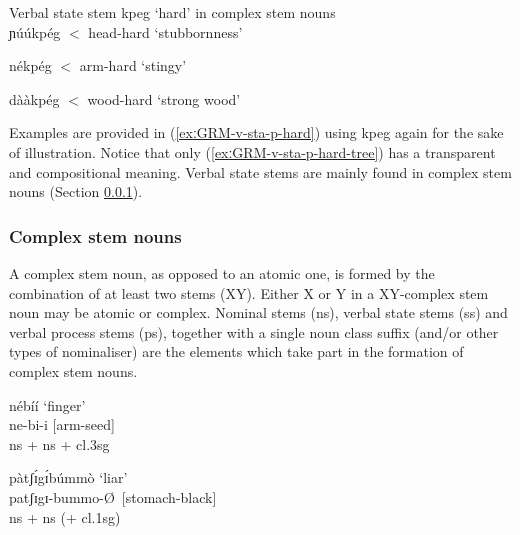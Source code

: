 \begin{exe}
\begin{exe}
\begin{exe}
\begin{exe}
\begin{exe}
\begin{exe}
\ea\label{exːGRM-v-sta-p-hard}{\rm Verbal state stem {\sls kpeg}  `hard' in
complex stem nouns}\\
 
 \ea\label{exːGRM-v-sta-p-hard-head}
{ɲúú{\ꜜ}kpég} $<$ {\rm head-hard `stubbornness'} 

 \ex\label{exːGRM-v-sta-p-hard-arm}
{nékpég} $<$ {\rm arm-hard  `stingy'} 

 \ex\label{exːGRM-v-sta-p-hard-tree}
{dààkpég} $<$ {\rm wood-hard  `strong wood'}
 
\z 
 \z
 

 Examples  are provided in (\ref{exːGRM-v-sta-p-hard}) using  {\sls kpeg} again for the sake of illustration.  Notice that only (\ref{exːGRM-v-sta-p-hard-tree}) has a transparent and compositional meaning. Verbal state stems are mainly found in complex stem nouns (Section \ref{sec:GRM-com-stem-noun}). 



\subsubsection{Complex stem nouns}
\label{sec:GRM-com-stem-noun}

A  complex stem noun, as opposed to an atomic one,  is formed by the combination of at least two stems (XY). Either X or Y in a  XY-complex stem noun may be atomic or complex.  Nominal stems ({\sc ns}), verbal state stems ({\sc ss}) and verbal process stems ({\sc ps}), together with a single noun class  suffix (and/or other types of nominaliser) are the  elements which take part in the formation of complex stem nouns. 

\ea\label{exːGRM-cplx-stm}

  \ea\label{exːGRM-cplx-stm-NS-NS-1}%
{\sls nébíí} {\rm  `finger'}\\%
ne-bi-i    {\rm [arm-seed]}\\%
 {\sc ns + ns +  cl.3sg}
 
 \newpage 
  \ex\label{exːGRM-cplx-stm-NS-NS-2}
 {\sls pàtʃɪ́gɪ́búmmò} {\rm  `liar'}\\%
patʃɪgɪ-bummo-\O \      {\rm [stomach-black]}\\%
 {\sc ns +  ns (+  cl.1sg)}


\end{exe}
\end{exe}
\end{exe}
\end{exe}
\end{exe}
\end{exe}
